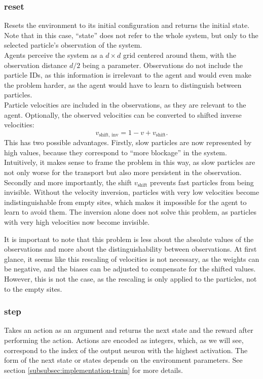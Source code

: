 \subsubsection{reset}
Resets the environment to its initial configuration and returns the initial state. Note that in this case, \enquote{state} does not refer to the whole system, but only to the selected particle's observation of the system. 
\\
Agents perceive the system as a $d\times d$ grid centered around them, with the observation distance $d/2$ being a parameter. Observations do not include the particle IDs, as this information is irrelevant to the agent and would even make the problem harder, as the agent would have to learn to distinguish between particles. 
\\
Particle velocities are included in the observations, as they are relevant to the agent. Optionally, the observed velocities can be converted to shifted inverse velocities:
\begin{equation}
    v_{\text{shift, inv}} = 1 - v + v_{\text{shift}} \text{.}
    \label{eq:inverse-velocities}
\end{equation}
This has two possible advantages. Firstly, slow particles are now represented by high values, because they correspond to \enquote{more blockage} in the system. Intuitively, it makes sense to frame the problem in this way, as slow particles are not only worse for the transport but also more persistent in the observation. Secondly and more importantly, the shift $v_{\text{shift}}$ prevents fast particles from being invisible. Without the velocity inversion, particles with very low velocities become indistinguishable from empty sites, which makes it impossible for the agent to learn to avoid them. The inversion alone does not solve this problem, as particles with very high velocities now become invisible. 


It is important to note that this problem is less about the absolute values of the observations and more about the distinguishability between observations. At first glance, it seems like this rescaling of velocities is not necessary, as the weights can be negative, and the biases can be adjusted to compensate for the shifted values. However, this is not the case, as the rescaling is only applied to the particles, not to the empty sites. 


\subsubsection{step}
\label{subsubsec:implementation-step}
Takes an action as an argument and returns the next state and the reward after performing the action. Actions are encoded as integers, which, as we will see, correspond to the index of the output neuron with the highest activation. The form of the next state or states depends on the environment parameters. See section \ref{subsubsec:implementation-train} for more details.


